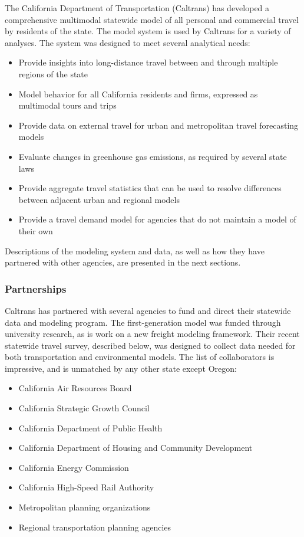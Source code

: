 The California Department of Transportation (Caltrans) has developed a comprehensive multimodal statewide model of all personal and commercial travel by residents of the state. The model system is used by Caltrans for a variety of analyses. The system was designed to meet several analytical needs:

\begin{itemize}
\item Provide insights into long-distance travel between and through multiple regions of the state
\item Model behavior for all California residents and firms, expressed as multimodal tours and trips
\item Provide data on external travel for urban and metropolitan travel forecasting models
\item Evaluate changes in greenhouse gas emissions, as required by several state laws
\item Provide aggregate travel statistics that can be used to resolve differences between adjacent urban and regional models
\item Provide a travel demand model for agencies that do not maintain a model of their own
\end{itemize}

Descriptions of the modeling system and data, as well as how they have partnered with other agencies, are presented in the next sections.

\subsubsection{Partnerships}

Caltrans has partnered with several agencies to fund and direct their statewide data and modeling program. The first-generation model was funded through university research, as is work on a new freight modeling framework. Their recent statewide travel survey, described below, was designed to collect data needed for both transportation and environmental models. The list of collaborators is impressive, and is unmatched by any other state except Oregon:

\begin{itemize}
\item California Air Resources Board
\item California Strategic Growth Council
\item California Department of Public Health
\item California Department of Housing and Community Development
\item California Energy Commission
\item California High-Speed Rail Authority
\item Metropolitan planning organizations
\item Regional transportation planning agencies
\end{itemize}

